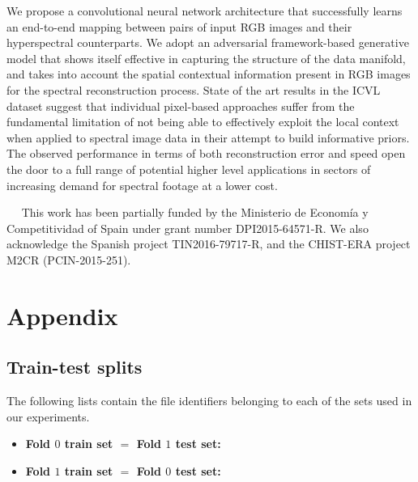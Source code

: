 \documentclass[10pt,twocolumn,letterpaper]{article}
\newcommand{\minisection}[1]{\vspace{0.04in} \noindent {\bf #1}\ \ }
\begin{document}
We propose a convolutional neural network architecture that successfully learns an end-to-end mapping between pairs of input RGB images and their hyperspectral counterparts.
We adopt an adversarial framework-based generative model that shows itself effective in capturing the structure of the data manifold, and takes into account the spatial contextual information present in RGB images for the spectral reconstruction process. 
State of the art results in the ICVL dataset suggest that individual pixel-based approaches suffer from the fundamental limitation of not being able to effectively exploit the local context when applied to spectral image data in their attempt to build informative priors. 
The observed performance in terms of both reconstruction error and speed open the door to a full range of potential higher level applications in sectors of increasing demand for spectral footage at a lower cost.

\minisection{Acknowledgements}
This work has been partially funded by the Ministerio de Econom\'ia y Competitividad of Spain under grant number DPI2015-64571-R. We also acknowledge the Spanish project TIN2016-79717-R, and the CHIST-ERA project M2CR (PCIN-2015-251).  

{\small


}

\clearpage

\section{Appendix}
\subsection{Train-test splits}
The following lists contain the file identifiers belonging to each of the sets used in our experiments.

\begin{itemize}
\item \textbf{Fold $0$ train set $=$ Fold $1$ test set:}
%

\newpage
\item \textbf{Fold $1$ train set $=$ Fold $0$ test set:}

\end{itemize}
\end{document}
